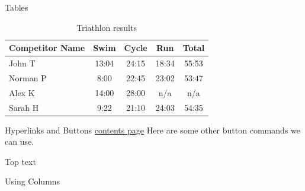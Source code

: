 \documentclass[aspectratio=169]{beamer}
\begin{document}
\begin{frame}{Tables}
\begin{table}
\begin{tabular}{l | c | c | c | c }
Competitor Name & Swim & Cycle & Run & Total \\
\hline \hline
John T & 13:04 & 24:15 & 18:34 & 55:53 \\ 
Norman P & 8:00 & 22:45 & 23:02 & 53:47\\
Alex K & 14:00 & 28:00 & n/a & n/a\\
Sarah H & 9:22 & 21:10 & 24:03 & 54:35 
\end{tabular}
\caption{Triathlon results}
\end{table}
\end{frame}

\begin{frame}{Hyperlinks and Buttons}
\hyperlink{contents}{contents page}
Here are some other button commands we can use.

\hyperlink{columns}{}

\hyperlink{pictures}{}

\hyperlink{pictures}{}
\end{frame}

\begin{frame}[t]{Top text}
    \lipsum[66]
\end{frame}

\begin{frame}{Using Columns}
    \begin{columns}
        \lipsum[66]
        \lipsum[66]
    \end{columns}
\end{frame}

\end{document}
